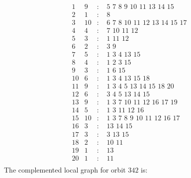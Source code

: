 \documentclass[12pt]{article}
\begin{document}
\begin{equation*}
\begin{array}{rrcl}
1&9&:&\,\,5\,\,7\,\,8\,\,9\,\,10\,\,11\,\,13\,\,14\,\,15\\
2&1&:&\,\,8\\
3&10&:&\,\,6\,\,7\,\,8\,\,10\,\,11\,\,12\,\,13\,\,14\,\,15\,\,17\\
4&4&:&\,\,7\,\,10\,\,11\,\,12\\
5&3&:&\,\,1\,\,11\,\,12\\
6&2&:&\,\,3\,\,9\\
7&5&:&\,\,1\,\,3\,\,4\,\,13\,\,15\\
8&4&:&\,\,1\,\,2\,\,3\,\,15\\
9&3&:&\,\,1\,\,6\,\,15\\
10&6&:&\,\,1\,\,3\,\,4\,\,13\,\,15\,\,18\\
11&9&:&\,\,1\,\,3\,\,4\,\,5\,\,13\,\,14\,\,15\,\,18\,\,20\\
12&6&:&\,\,3\,\,4\,\,5\,\,13\,\,14\,\,15\\
13&9&:&\,\,1\,\,3\,\,7\,\,10\,\,11\,\,12\,\,16\,\,17\,\,19\\
14&5&:&\,\,1\,\,3\,\,11\,\,12\,\,16\\
15&10&:&\,\,1\,\,3\,\,7\,\,8\,\,9\,\,10\,\,11\,\,12\,\,16\,\,17\\
16&3&:&\,\,13\,\,14\,\,15\\
17&3&:&\,\,3\,\,13\,\,15\\
18&2&:&\,\,10\,\,11\\
19&1&:&\,\,13\\
20&1&:&\,\,11\\
\end{array}
\end{equation*}
The complemented local graph for orbit $342$ is:
\end{document}
